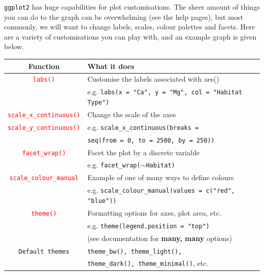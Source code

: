 \documentclass[a4paper,12pt]{article}
\newcommand\code[1]{\textcolor{red}{\texttt{#1}}}
\begin{document}
\texttt{ggplot2} has huge capabilities for plot customisations. The sheer amount of things you can do to the graph can be overwhelming (see the help pages), but most commonly, we will want to change labels, scales, colour palettes and facets. Here are a variety of customisations you can play with, and an example graph is given below.
\clearpage

\begin{table}[h]
	\centering
	\begin{tabular}{cl}
		
		Function & What it does \\ \hline
		\code{labs()} & Customise the labels associated with aes() \\
		              & e.g. \texttt{labs(x = "Ca", y = "Mg", col = "Habitat Type")} \\ \hline
		\code{scale\_x\_continuous()} & Change the scale of the axes \\
		\code{scale\_y\_continuous()} & e.g. \texttt{scale\_x\_continuous(breaks =} \\
		                              & \hspace*{1cm}\texttt{seq(from = 0, to = 2500, by = 250))} \\ \hline
		\code{facet\_wrap()} & Facet the plot by a discrete variable \\
		                  & e.g. \texttt{facet\_wrap($\sim$Habitat)} \\  \hline
		\code{scale\_colour\_manual} & Example of one of many ways to define colours \\
		                           & e.g. \texttt{scale\_colour\_manual(values = c("red", "blue"))} \\ \hline
		\code{theme()} & Formatting options for axes, plot area, etc. \\
		               & e.g. \texttt{theme(legend.position = "top")} \\
		               & (see documentation for \textbf{many, many} options) \\ \hline
		\texttt{Default themes} & \texttt{theme\_bw(), theme\_light(),} \\
		                        & \texttt{theme\_dark(), theme\_minimal()}, etc. \\
		\hline
		
	\end{tabular}
	 
	\label{tbl:ggplot_customisations}
\end{table}
\end{document}
